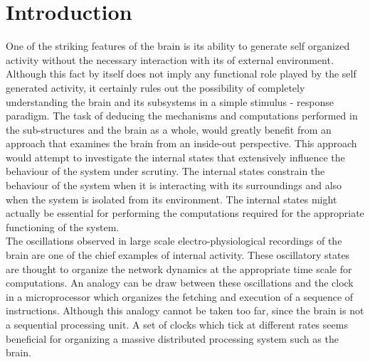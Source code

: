 \chapter{Introduction} 

\label{intro}

One of the striking features of the brain is its ability to generate self organized activity without the necessary interaction with its of external environment. Although this fact by itself does not imply any functional role played by the self generated activity, it certainly rules out the possibility of completely understanding the brain and its subsystems in a simple stimulus - response paradigm. The task of deducing the mechanisms and computations performed in the sub-structures and  the brain as a whole, would greatly benefit from an approach that examines the brain from an inside-out perspective. This approach would attempt to investigate the internal states that extensively influence the behaviour of the system under scrutiny. The internal states constrain the behaviour of the system when it is interacting with its surroundings and also when the system is isolated from its environment. The internal states might actually be essential for performing the computations required for the appropriate functioning of the system. \\

The oscillations observed in large scale electro-physiological recordings of the brain are one of the chief examples of internal  activity. These oscillatory states are thought to organize the network dynamics at the appropriate time scale for computations. An analogy can be draw between these oscillations and the clock in a microprocessor which organizes the fetching and execution of a sequence of instructions. Although this analogy cannot be taken too far, since the brain is not a sequential processing unit. A set of clocks which tick at different rates seems beneficial for organizing a massive distributed processing system such as the brain. \\

